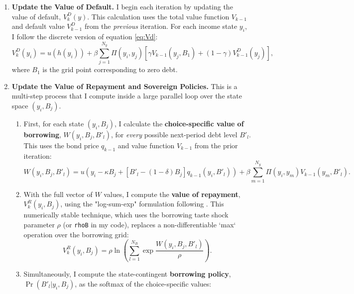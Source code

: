 \documentclass[12pt]{article}
\theoremstyle{plain}
\begin{document}
\begin{enumerate}
	\item \textbf{Update the Value of Default.} I begin each iteration by updating the value of default, $V^D_k(y)$. This calculation uses the total value function $V_{k-1}$ and default value $V^D_{k-1}$ from the \textit{previous} iteration. For each income state $y_i$, I follow the discrete version of equation \eqref{eq:Vd}:
	      \begin{equation*}
		      V^D_k(y_i) = u(h(y_i)) + \beta \sum_{j=1}^{N_y} \Pi(y_i, y_j) \left[ \gamma V_{k-1}(y_j, B_1) + (1-\gamma) V^D_{k-1}(y_j) \right],
	      \end{equation*}
	      where $B_1$ is the grid point corresponding to zero debt.

	\item \textbf{Update the Value of Repayment and Sovereign Policies.} This is a multi-step process that I compute inside a large parallel loop over the state space $(y_i, B_j)$.
	      \begin{enumerate}
		      \item First, for each state $(y_i, B_j)$, I calculate the \textbf{choice-specific
			            value of borrowing}, $W(y_i, B_j, B'_l)$, for \textit{every} possible
		            next-period debt level $B'_l$. This uses the bond price $q_{k-1}$ and value
		            function $V_{k-1}$ from the prior iteration:
		            \begin{equation*}
			            W(y_i, B_j, B'_l) = u(y_i - \kappa B_j + [B'_l - (1-\delta)B_j]q_{k-1}(y_i, B'_l)) + \beta \sum_{m=1}^{N_y} \Pi(y_i, y_m) V_{k-1}(y_m, B'_l).
		            \end{equation*}
		      \item With the full vector of $W$ values, I compute the \textbf{value of repayment},
		            $V^R_k(y_i, B_j)$, using the "log-sum-exp" formulation following
		            \citep{MIHALACHEOREEF2024}. This numerically stable technique, which uses the
		            borrowing taste shock parameter $\rho$ (or \texttt{rhoB} in my code), replaces
		            a non-differentiable `max` operation over the borrowing grid:
		            \begin{equation*}
			            V^R_k(y_i, B_j) = \rho \ln\left( \sum_{l=1}^{N_B} \exp\frac{W(y_i, B_j, B'_l)}{\rho} \right).
		            \end{equation*}
		      \item Simultaneously, I compute the state-contingent \textbf{borrowing policy},
		            $\Pr(B'_l | y_i, B_j)$, as the softmax of the choice-specific values:

\end{enumerate}
\end{enumerate}
\end{document}
